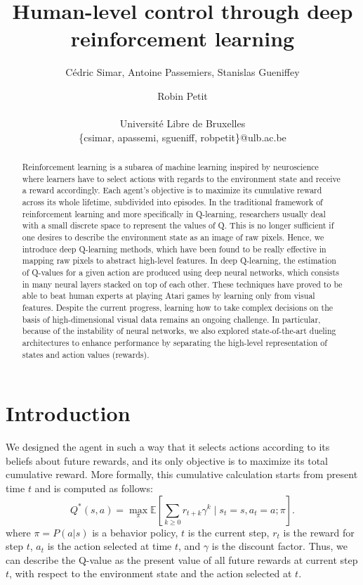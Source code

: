 \documentclass[letterpaper]{article}
\title{Human-level control through deep reinforcement learning}
\author{C\'{e}dric Simar, Antoine Passemiers, Stanislas Gueniffey \and Robin Petit \\
\mbox{}\\
Universit\'{e} Libre de Bruxelles \\
\{csimar, apassemi, sgueniff, robpetit\}@ulb.ac.be}
\newcommand{\E}{\mathbb E}
\begin{document}
\maketitle

\begin{abstract}

  Reinforcement learning is a subarea of machine learning inspired by neuroscience where learners have to select actions with
  regards to the environment state and receive a reward accordingly. Each agent's objective is to maximize its cumulative reward across its whole lifetime,
  subdivided into episodes. In the traditional framework of reinforcement learning and more specifically in Q-learning,
  researchers usually deal with a small discrete space to represent the values of Q. This is no longer sufficient if one desires to describe the environment state
  as an image of raw pixels. Hence, we introduce deep Q-learning methods, which have been found to be really effective in mapping raw pixels
  to abstract high-level features. In deep Q-learning, the estimation of Q-values for a given action are produced using deep neural networks,
  which consists in many neural layers stacked on top of each other.
  These techniques have proved to be able to beat human experts at playing Atari games
  by learning only from visual features. Despite the current progress, learning how to take complex decisions on the basis of high-dimensional visual data remains an
  ongoing challenge. In particular, because of the instability of neural networks, we also explored state-of-the-art dueling architectures to enhance performance
  by separating the high-level representation of states and action values (rewards).

\end{abstract}

\section{Introduction}

We designed the agent in such a way that it selects actions according to its beliefs about future rewards, and its only objective is to maximize its total
cumulative reward. More formally, this cumulative calculation starts from present time $t$ and is computed as follows:
\begin{equation}
  Q^{*}(s, a) = \max_{\pi} \E\left[ \sum_{k \geq 0}r_{t+k}\gamma^k \; \big| \; s_t = s, a_t = a; \pi\right].
\end{equation}
where $\pi = P(a | s)$ is a behavior policy, $t$ is the current step, $r_t$ is the reward for step $t$, $a_t$ is the action selected at time $t$,
and $\gamma$ is the discount factor. Thus, we can describe the Q-value as the present value of all future rewards at current step $t$,
with respect to the environment state and the action selected at $t$.
\end{document}
